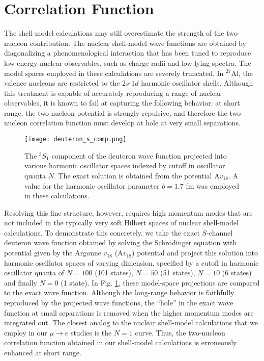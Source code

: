 \documentclass[12pt,letterpaper]{book}
\begin{document}
\section{Correlation Function}
\label{sec:cor_fun}
The shell-model calculations may still overestimate the strength of the two-nucleon contribution. The nuclear shell-model wave functions are obtained by diagonalizing a phenomenological interaction that has been tuned to reproduce low-energy nuclear observables, such as charge radii and low-lying spectra. The model spaces employed in these calculations are severely truncated. In $^{27}$Al, the valence nucleons are restricted to the $2s$-$1d$ harmonic oscillator shells. Although this treatment is capable of accurately reproducing a range of nuclear observables, it is known to fail at capturing the following behavior: at short range, the two-nucleon potential is strongly repulsive, and therefore the two-nucleon correlation function must develop at hole at very small separations.

\begin{figure}
\centering
\texttt{[image: deuteron\_s\_comp.png]}
\caption{The $^3S_1$ component of the deuteron wave function projected into various harmonic oscillator spaces indexed by cutoff in oscillator quanta $N$. The exact solution is obtained from the potential A$v_{18}$. A value for the harmonic oscillator parameter $b=1.7$ fm was employed in these calculations.}
\label{fig:deuteron_proj}
\end{figure}

Resolving this fine structure, however, requires high momentum modes that are not included in the typically very soft Hilbert spaces of nuclear shell-model calculations. To demonstrate this concretely, we take the exact $S$-channel deuteron wave function obtained by solving the Schr\"odinger equation with potential given by the Argonne $v_{18}$ (A$v_{18}$) potential \cite{PhysRevC.51.38} and project this solution into harmonic oscillator spaces of varying dimension, specified by a cutoff in harmonic oscillator quanta of $N=100$ (101 states), $N=50$ (51 states), $N=10$ (6 states) and finally $N=0$ (1 state). In Fig. \ref{fig:deuteron_proj}, these model-space projections are compared to the exact wave function. Although the long-range behavior is faithfully reproduced by the projected wave functions, the ``hole'' in the exact wave function at small separations is removed when the higher momentum modes are integrated out. The closest analog to the nuclear shell-model calculations that we employ in our $\mu\rightarrow e$ studies is the $N=1$ curve. Thus, the two-nucleon correlation function obtained in our shell-model calculations is erroneously enhanced at short range.
\end{document}
